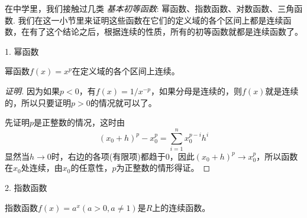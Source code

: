 在中学里，我们接触过几类 \emph{基本初等函数}: 幂函数、指数函数、对数函数、三角函数. 我们在这一小节里来证明这些函数在它们的定义域的各个区间上都是连续函数，在有了这个结论之后，根据连续的性质，所有的初等函数就都是连续函数了。

1. 幂函数
\begin{theorem}
  幂函数$f(x)=x^p$在定义域的各个区间上连续。
\end{theorem}

\begin{proof}[证明]
  因为如果$p<0$，有$f(x)=1/x^{-p}$，如果分母是连续的，则$f(x)$就是连续的，所以只要证明$p>0$的情况就可以了。

  先证明$p$是正整数的情况，这时由
  \[ (x_0+h)^p-x_0^p = \sum_{i=1}^nx_0^{p-i}h^i \]
  显然当$h \to 0$时，右边的各项(有限项)都趋于0，因此$(x_0+h)^p \to x_0^p$，所以函数在$x_0$处连续，由$x_0$的任意性，$p$为正整数的情形得证。
\end{proof}

2. 指数函数
\begin{theorem}
  指数函数$f(x)=a^x(a>0,a\neq 1)$是$R$上的连续函数。
\end{theorem}



